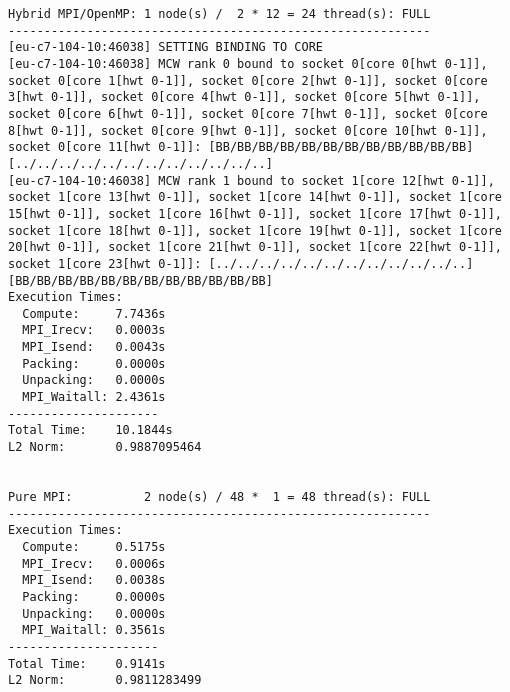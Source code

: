 \begin{lstlisting}[basicstyle=\tiny, frame=single, caption={Task 2: Collected Euler outputs.}, label={lst:1}]
Hybrid MPI/OpenMP: 1 node(s) /  2 * 12 = 24 thread(s): FULL
-----------------------------------------------------------
[eu-c7-104-10:46038] SETTING BINDING TO CORE
[eu-c7-104-10:46038] MCW rank 0 bound to socket 0[core 0[hwt 0-1]], socket 0[core 1[hwt 0-1]], socket 0[core 2[hwt 0-1]], socket 0[core 3[hwt 0-1]], socket 0[core 4[hwt 0-1]], socket 0[core 5[hwt 0-1]], socket 0[core 6[hwt 0-1]], socket 0[core 7[hwt 0-1]], socket 0[core 8[hwt 0-1]], socket 0[core 9[hwt 0-1]], socket 0[core 10[hwt 0-1]], socket 0[core 11[hwt 0-1]]: [BB/BB/BB/BB/BB/BB/BB/BB/BB/BB/BB/BB][../../../../../../../../../../../..]
[eu-c7-104-10:46038] MCW rank 1 bound to socket 1[core 12[hwt 0-1]], socket 1[core 13[hwt 0-1]], socket 1[core 14[hwt 0-1]], socket 1[core 15[hwt 0-1]], socket 1[core 16[hwt 0-1]], socket 1[core 17[hwt 0-1]], socket 1[core 18[hwt 0-1]], socket 1[core 19[hwt 0-1]], socket 1[core 20[hwt 0-1]], socket 1[core 21[hwt 0-1]], socket 1[core 22[hwt 0-1]], socket 1[core 23[hwt 0-1]]: [../../../../../../../../../../../..][BB/BB/BB/BB/BB/BB/BB/BB/BB/BB/BB/BB]
Execution Times:
  Compute:     7.7436s
  MPI_Irecv:   0.0003s
  MPI_Isend:   0.0043s
  Packing:     0.0000s
  Unpacking:   0.0000s
  MPI_Waitall: 2.4361s
---------------------
Total Time:    10.1844s
L2 Norm:       0.9887095464


Pure MPI:          2 node(s) / 48 *  1 = 48 thread(s): FULL
-----------------------------------------------------------
Execution Times:
  Compute:     0.5175s
  MPI_Irecv:   0.0006s
  MPI_Isend:   0.0038s
  Packing:     0.0000s
  Unpacking:   0.0000s
  MPI_Waitall: 0.3561s
---------------------
Total Time:    0.9141s
L2 Norm:       0.9811283499



\end{lstlisting}
